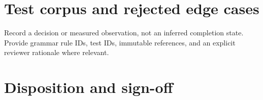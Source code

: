 \documentclass[11pt,letterpaper]{article}
\begin{document}
\section{Test corpus and rejected edge cases}
Record a decision or measured observation, not an inferred completion state. Provide grammar rule IDs, test IDs, immutable references, and an explicit reviewer rationale where relevant.
\section{Disposition and sign-off}
\end{document}
